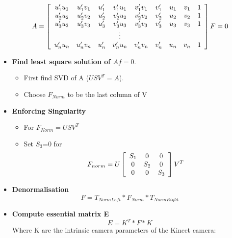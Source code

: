 \documentclass[a4paper,12pt]{article}
\begin{document}
\begin{itemize}
\begin{equation}
            A = \left[ 
            \begin{array}[ ]{ccccccccc}
                u'_1u_1 & u'_1v_1 & u'_1 & v'_1u_1 &v'_1v_1 & v'_1 & u_1 & v_1 & 1 \\
                u'_2u_2 & u'_2v_2 & u'_2 & v'_2u_2 &v'_2v_2 & v'_2 & u_2 & v_2 & 1 \\
                u'_3u_3 & u'_3v_3 & u'_3 & v'_3u_3 &v'_3v_3 & v'_3 & u_3 & v_3 & 1 \\
                &&& \vdots \\
                u'_nu_n & u'_nv_n & u'_n & v'_nu_n &v'_nv_n & v'_n & u_n & v_n & 1 
            \end{array}
            \right] F = 0
        \end{equation}
    \item \textbf{Find least square solution of $Af = 0$}. 
        \begin{itemize}
            \item First find SVD of A ($USV^T = A$).
            \item Choose $F_{Norm}$ to be the last column of V
        \end{itemize}
    \item \textbf{Enforcing Singularity} 
        \begin{itemize}
            \item For $F_{Norm}=USV^T$ 
            \item Set $S_3$=0 for 
            \begin{equation}
                       F_{norm} =U \left[ 
            \begin{array}[]{ccc}
                        S_1 & 0 & 0 \\
                        0 & S_2  & 0 \\
                        0 & 0 & S_3 
                    \end{array}
            \right] V^T
            \end{equation}
        \end{itemize}
    \item \textbf{Denormalisation}
    	\begin{equation}
    	F=T_{NormLeft}*F_{Norm}*T_{NormRight}
    	\end{equation}
    \item \textbf{Compute essential matrix E}
        \begin{equation}
            E =  K^T*F*K 
        \end{equation}
        Where K are the intrinsic camera parameters of the Kinect camera:

\end{itemize}
\end{document}
